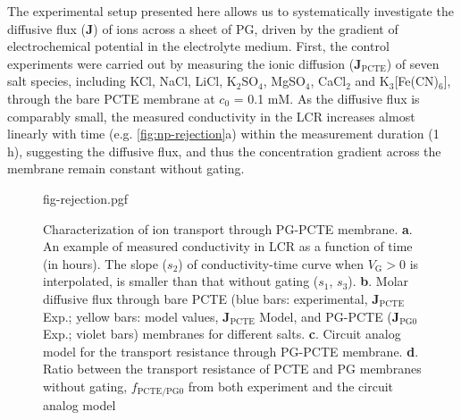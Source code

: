 The experimental setup presented here allows us to systematically
investigate the diffusive flux ($\symbf{J}$) of ions across a sheet of
PG, driven by the gradient of electrochemical potential in the
electrolyte medium.
%
First, the control experiments were carried out by measuring the ionic
diffusion ($\symbf{J}_{\mathrm{PCTE}}$) of seven salt species,
including KCl, NaCl, LiCl, K$_{2}$SO$_{4}$, MgSO$_{4}$, CaCl$_{2}$ and
K$_{3}$[Fe(CN)$_{6}$], through the bare PCTE membrane at $c_{0}$ = 0.1
mM.
%
As the diffusive flux is comparably small, the measured conductivity
in the LCR increases almost linearly with time (e.g.
\autoref{fig:np-rejection}a) within the measurement duration (1 h), suggesting
the diffusive flux, and thus the concentration gradient across the
membrane remain constant without gating.
%
\begin{figure}[!htbp]
  \centering{}
  {fig-rejection.pgf}
  \caption{Characterization of ion transport through PG-PCTE membrane.
    \textbf{a}. An example of measured conductivity in LCR as a
    function of time (in hours). The slope ($s_{2}$) of
    conductivity-time curve when $V_{\mathrm{G}}>0$ is interpolated,
    is smaller than that without gating ($s_{1}$,
    $s_{3}$). \textbf{b}. Molar diffusive flux through bare PCTE (blue
    bars: experimental, $\symbf{J}_{\mathrm{PCTE}}$ Exp.; yellow bars:
    model values, $\symbf{J}_{\mathrm{PCTE}}$ Model, and PG-PCTE
    ($\symbf{J}_{\mathrm{PG0}}$ Exp.; violet bars) membranes for
    different salts. \textbf{c}. Circuit analog model for the
    transport resistance through PG-PCTE membrane. \textbf{d}. Ratio
    between the transport resistance of PCTE and PG membranes without
    gating, $f_{\mathrm{PCTE/PG0}}$ from both experiment and the
    circuit analog model}
  \label{fig:np-rejection}
\end{figure}

